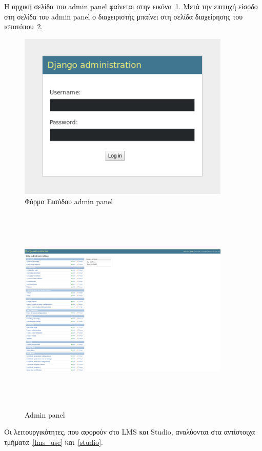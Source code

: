 \documentclass[12pt]{report}
\begin{document}
Η αρχική σελίδα του \textlatin{admin panel} φαίνεται στην εικόνα~\ref{fig:django-login}. Μετά την επιτυχή είσοδο στη σελίδα του \textlatin{admin panel} ο διαχειριστής μπαίνει στη σελίδα διαχείρησης του ιστοτόπου~\ref{fig:django-landing}.
\begin{figure}[!htbp]
\centering
\includegraphics[width=0.9\textwidth, height=8cm]{django-login}
\caption{Φόρμα Εισόδου \textlatin{admin panel}}
\label{fig:django-login}
\end{figure}

\begin{figure}[!htbp]
\centering
\includegraphics[width=0.9\textwidth, height=10cm]{django-landing-page}
\caption{\textlatin{Admin panel}}
\label{fig:django-landing}
\end{figure}

Οι λειτουργικότητες, που αφορούν στο \textlatin{LMS} και \textlatin{Studio}, αναλύονται στα αντίστοιχα τμήματα~\ref{lms_use} και~\ref{studio}.
\end{document}
